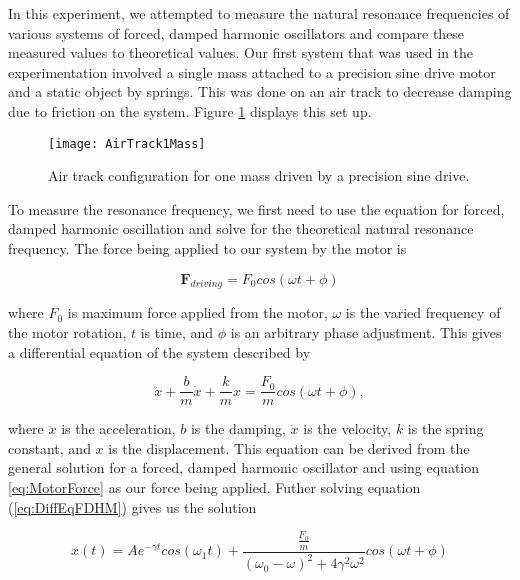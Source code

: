 \par In this experiment, we attempted to measure the natural resonance frequencies of various systems of forced, damped harmonic oscillators and compare these measured values to theoretical values. Our first system that was used in the experimentation involved a single mass attached to a precision sine drive motor and a static object by springs. This was done on an air track to decrease damping due to friction on the system. Figure \ref{figure:AirTrack1Mass} displays this set up.

\begin{figure}[htb!]
\centering
\texttt{[image: AirTrack1Mass]}
\caption{Air track configuration for one mass driven by a precision sine drive.}
\label{figure:AirTrack1Mass}
\end{figure}

\par To measure the resonance frequency, we first need to use the equation for forced, damped harmonic oscillation and solve for the theoretical natural resonance frequency. The force being applied to our system by the motor is

\begin{equation}
\textbf{F}_{driving} = F_0 cos(\omega t + \phi)
\label{eq:MotorForce}
\end{equation}

\noindent where $F_0$ is maximum force applied from the motor, $\omega$ is the varied frequency of the motor rotation, $t$ is time, and $\phi$ is an arbitrary phase adjustment. This gives a differential equation of the system described by

\begin{equation}
\ddot{x} + \frac{b}{m}\dot{x} + \frac{k}{m}x = \frac{F_0}{m} cos(\omega t + \phi) ,
\label{eq:DiffEqFDHM}
\end{equation}

\noindent where $\ddot{x}$ is the acceleration, $b$ is the damping, $\dot{x}$ is the velocity, $k$ is the spring constant, and $x$ is the displacement. This equation can be derived from the  general solution for a forced, damped harmonic oscillator and using equation \ref{eq:MotorForce} as our force being applied. Futher solving equation (\ref{eq:DiffEqFDHM}) gives us the solution

\begin{equation}
x(t) = Ae^{- \gamma t} cos( \omega_1 t) + \frac{\frac{F_0}{m}}{(\omega_0 - \omega)^2 + 4 \gamma^2 \omega^2} cos(\omega t + \phi)
\label{eq:solution1cart}
\end{equation}

